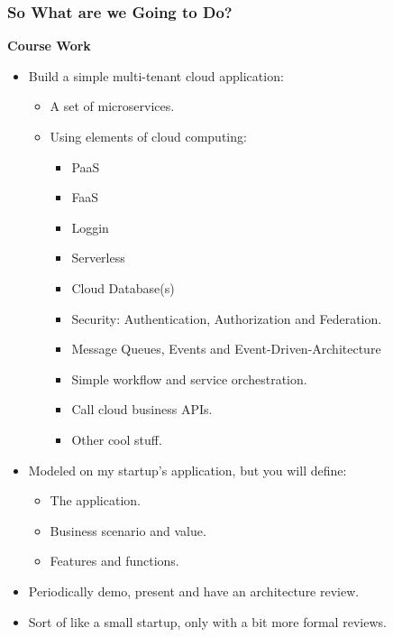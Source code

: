 \documentclass[11pt]{article}
\providecommand{\tightlist}{%
      \setlength{\itemsep}{0pt}\setlength{\parskip}{0pt}}
\begin{document}
    \subsubsection{So What are we Going to
Do?}\label{so-what-are-we-going-to-do}

\textbf{Course Work}

\begin{itemize}
\item
  Build a simple multi-tenant cloud application:

  \begin{itemize}
  \tightlist
  \item
    A set of microservices.
  \item
    Using elements of cloud computing:

    \begin{itemize}
    \tightlist
    \item
      PaaS
    \item
      FaaS
    \item
      Loggin
    \item
      Serverless
    \item
      Cloud Database(s)
    \item
      Security: Authentication, Authorization and Federation.
    \item
      Message Queues, Events and Event-Driven-Architecture
    \item
      Simple workflow and service orchestration.
    \item
      Call cloud business APIs.
    \item
      Other cool stuff.
    \end{itemize}
  \end{itemize}
\item
  Modeled on my startup's application, but you will define:

  \begin{itemize}
  \tightlist
  \item
    The application.
  \item
    Business scenario and value.
  \item
    Features and functions.
  \end{itemize}
\item
  Periodically demo, present and have an architecture review.
\item
  Sort of like a small startup, only with a bit more formal reviews.
\end{itemize}
\end{document}

